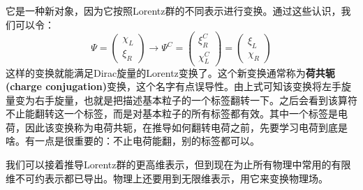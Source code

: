 它是一种新对象，因为它按照Lorentz群的不同表示进行变换。通过这些认识，我们可以令：
\begin{equation}
\label{equ3.236}
    \Psi =
        \begin{pmatrix}
            \chi_L \\ \xi_R
        \end{pmatrix}
    \rightarrow
    \Psi^C =
        \begin{pmatrix}
            \xi_R^C \\ \chi_L^C
        \end{pmatrix}
    =
        \begin{pmatrix}
            \xi_L \\ \chi_R
        \end{pmatrix}
\end{equation}
这样的变换就能满足Dirac旋量的Lorentz变换了。这个新变换通常称为{\bfseries 荷共轭(charge conjugation)}变换，这个名字有点误导性。由上式可知该变换将左手旋量变为右手旋量，也就是把描述基本粒子的一个标签翻转一下。之后会看到该算符不止能翻转这一个标签，而是对基本粒子的所有标签都有效。其中一个标签是电荷，因此该变换称为电荷共轭，在推导如何翻转电荷之前，先要学习电荷到底是啥。有一点是很重要的：不止电荷能翻，别的标签都可以。

我们可以接着推导Lorentz群的更高维表示，但到现在为止所有物理中常用的有限维不可约表示都已导出。物理上还要用到无限维表示，用它来变换物理场。

